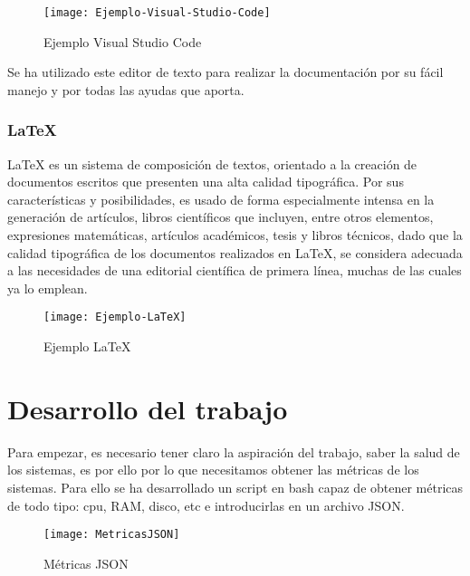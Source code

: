 \documentclass[ spanish, a4paper, 12pt, oneside]{report}
\begin{document}
\begin{figure}[!h]
   \centering
   \texttt{[image: Ejemplo-Visual-Studio-Code]}\\
      \caption{\label{fig: Ejemplo Visual Studio Code} Ejemplo Visual Studio Code}
\end{figure}

Se ha utilizado este editor de texto para realizar la documentación por su fácil manejo y por todas las ayudas que aporta. \\

\subsection{LaTeX}
LaTeX es un sistema de composición de textos, orientado a la creación de documentos escritos que presenten una alta calidad tipográfica. Por sus características y posibilidades, 
es usado de forma especialmente intensa en la generación de artículos, libros científicos que incluyen, entre otros elementos, expresiones matemáticas, artículos académicos, tesis y 
libros técnicos, dado que la calidad tipográfica de los documentos realizados en LaTeX, se considera adecuada a las necesidades de una editorial científica de primera línea, muchas de 
las cuales ya lo emplean. \\

\begin{figure}[!h]
   \centering
   \texttt{[image: Ejemplo-LaTeX]}\\
      \caption{\label{fig: Ejemplo LaTeX} Ejemplo LaTeX}
\end{figure}

\chapter{Desarrollo del trabajo}
Para empezar, es necesario tener claro la aspiración del trabajo, saber la salud de los sistemas, es por ello por lo que necesitamos 
obtener las métricas de los sistemas. Para ello se ha desarrollado un script en bash capaz de obtener métricas de todo tipo: cpu, 
RAM, disco, etc e introducirlas en un archivo JSON.\\

\begin{figure}[!h]
   \centering
   \texttt{[image: MetricasJSON]}\\
      \caption{\label{fig: json} Métricas JSON}
\end{figure}
\end{document}
